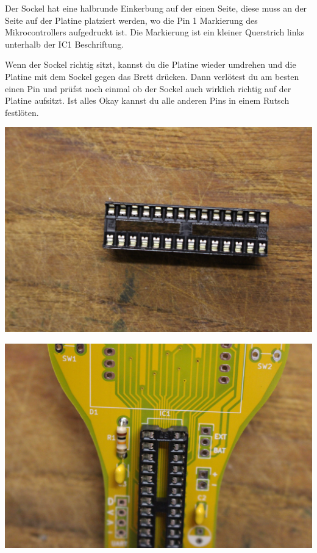 \documentclass{article}
\begin{document}
Der Sockel hat eine halbrunde Einkerbung auf der einen Seite, diese muss an der Seite auf der Platine platziert werden, wo die Pin 1 Markierung des Mikrocontrollers aufgedruckt ist. Die Markierung ist ein kleiner Querstrich links unterhalb der IC1 Beschriftung.

Wenn der Sockel richtig sitzt, kannst du die Platine wieder umdrehen und die Platine mit dem Sockel gegen das Brett drücken. Dann verlötest du am besten einen Pin und prüfst noch einmal ob der Sockel auch wirklich richtig auf der Platine aufsitzt. Ist alles Okay kannst du alle anderen Pins in einem Rutsch festlöten.

\begin{minipage}[b]{0.5\textwidth}
	\includegraphics[width=\textwidth]{Bilder/IMG_5553.JPG}
	\label{fig:}
\end{minipage}
\begin{minipage}[b]{0.5\textwidth}
	\includegraphics[width=\textwidth]{Bilder/IMG_5554.JPG}
	\label{fig:}
\end{minipage}
\end{document}
